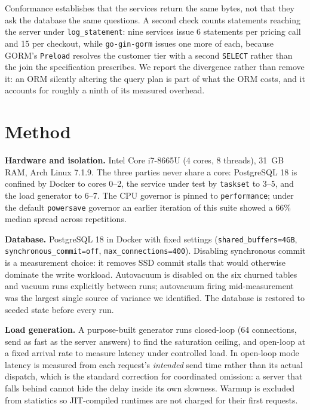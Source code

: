 \documentclass[11pt,a4paper]{article}
\begin{document}
Conformance establishes that the services return the same bytes, not that they
ask the database the same questions. A second check counts statements reaching
the server under \texttt{log\_statement}: nine services issue 6 statements per
pricing call and 15 per checkout, while \texttt{go-gin-gorm} issues one more of
each, because GORM's \texttt{Preload} resolves the customer tier with a second
\texttt{SELECT} rather than the join the specification prescribes. We report the
divergence rather than remove it: an ORM silently altering the query plan is
part of what the ORM costs, and it accounts for roughly a ninth of its measured
overhead.

\section{Method}

\textbf{Hardware and isolation.} Intel Core i7-8665U (4 cores, 8 threads),
31~GB RAM, Arch Linux 7.1.9. The three parties never share a core: PostgreSQL
18 is confined by Docker to cores 0--2, the service under test by
\texttt{taskset} to 3--5, and the load generator to 6--7. The CPU governor is
pinned to \texttt{performance}; under the default \texttt{powersave} governor an
earlier iteration of this suite showed a 66\% median spread across repetitions.

\textbf{Database.} PostgreSQL 18 in Docker with fixed settings
(\texttt{shared\_buffers=4GB}, \texttt{synchronous\_commit=off},
\texttt{max\_connections=400}). Disabling synchronous commit is a measurement
choice: it removes SSD commit stalls that would otherwise dominate the write
workload. Autovacuum is disabled on the six churned tables and vacuum runs
explicitly between runs; autovacuum firing mid-measurement was the largest
single source of variance we identified. The database is restored to seeded
state before every run.

\textbf{Load generation.} A purpose-built generator runs closed-loop (64
connections, send as fast as the server answers) to find the saturation
ceiling, and open-loop at a fixed arrival rate to measure latency under
controlled load. In open-loop mode latency is measured from each request's
\emph{intended} send time rather than its actual dispatch, which is the
standard correction for coordinated omission: a server that falls behind cannot
hide the delay inside its own slowness. Warmup is excluded from statistics so
JIT-compiled runtimes are not charged for their first requests.
\end{document}
